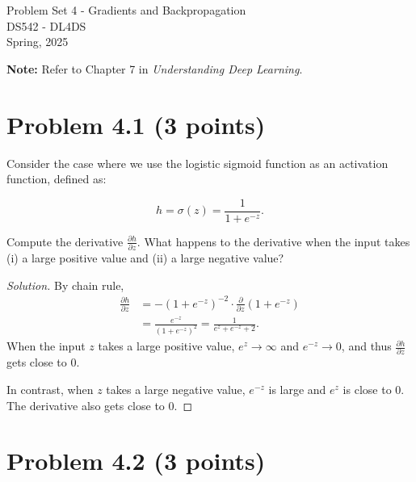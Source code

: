 \documentclass[10pt]{article}
\begin{document}
\begin{center}
    \LARGE {Problem Set 4 - Gradients and Backpropagation} \\[1em]
    \Large{DS542 - DL4DS} \\[0.5em]
    \large Spring, 2025
\end{center}

\vspace{2em}

\noindent\textbf{Note:} Refer to Chapter 7 in \textit{Understanding Deep Learning}.

\vspace{2em}

\section*{Problem 4.1 (3 points)}

Consider the case where we use the logistic sigmoid function as an activation function, defined as:

\begin{equation}
h = \sigma(z) = \frac{1}{1 + e^{-z}}.
\end{equation}

\noindent Compute the derivative \( \frac{\partial h}{\partial z} \). What happens
to the derivative when the input takes (i) a large positive value and (ii) a large negative value?

\begin{proof}[Solution]
    By chain rule, 
    \begin{align*}
        \frac{\partial h}{\partial z} &= -(1+e^{-z})^{-2} \cdot \frac{\partial}{\partial z}(1+e^{-z}) \\
        &= \frac{e^{-z}}{(1+e^{-z})^2} = \frac{1}{e^z + e^{-z} + 2}. 
    \end{align*}
    When the input \(z\) takes a large positive value, \(e^z \to \infty\) and \(e^{-z} \to 0\), and thus \(\frac{\partial h}{\partial z}\) gets close to \(0\). 

    In contrast, when \(z\) takes a large negative value, \(e^{-z}\) is large and \(e^z\) is close to \(0\). The derivative also gets close to \(0\). 
\end{proof}

\vspace{5em}

\section*{Problem 4.2 (3 points)}
\end{document}
